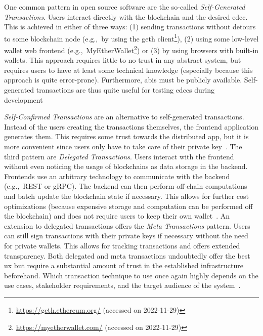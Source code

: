 One common pattern in open source software are the so-called \textit{Self-Generated Transactions}. Users interact directly with the blockchain and the desired \gls{edcc}. This is achieved in either of three ways: (1) sending transactions without detours to some blockchain node (e.g.,\ by using the geth client\footnote{\url{https://geth.ethereum.org/} (accessed on 2022-11-29)}), (2) using some low-level wallet web frontend (e.g.,\ MyEtherWallet\footnote{\url{https://myetherwallet.com/} (accessed on 2022-11-29)}) or (3) by using browsers with built-in wallets. This approach requires little to no trust in any abstract system, but requires users to have at least some technical knowledge (especially because this approach is quite error-prone). Furthermore, \glspl{abi} must be publicly available. Self-generated transactions are thus quite useful for testing \glspl{edcc} during development~\cite{engineering_software_architectures_of_BO_Apps}

\textit{Self-Confirmed Transactions} are an alternative to self-generated transactions. Instead of the users creating the transactions themselves, the frontend application generates them. This requires some trust towards the distributed app, but it is more convenient since users only have to take care of their private key~\cite{engineering_software_architectures_of_BO_Apps}. The third pattern are \textit{Delegated Transactions}. Users interact with the frontend without even noticing the usage of blockchains as data storage in the backend. Frontends use an arbitrary technology to communicate with the backend (e.g.,\ REST or gRPC). The backend can then perform off-chain computations and batch update the blockchain state if necessary. This allows for further cost optimizations (because expensive storage and computation can be performed off the blockchain) and does not require users to keep their own wallet~\cite{eberhardt17off_block}. An extension to delegated transactions offers the \textit{Meta Transactions} pattern. Users can still sign transactions with their private keys if necessary without the need for private wallets. This allows for tracking transactions and offers extended transparency. Both delegated and meta transactions undoubtedly offer the best \gls{ux} but require a substantial amount of trust in the established infrastructure beforehand. Which transaction technique to use once again highly depends on the use cases, stakeholder requirements, and the target audience of the system~\cite{building_hybrid_dapps_using_blockchain_tactics}.



